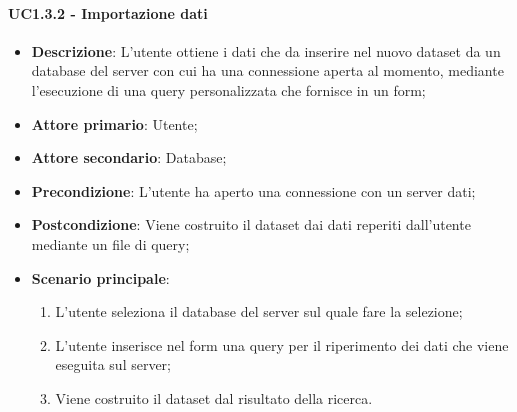 \paragraph{UC1.3.2 - Importazione dati}
\label{par:uc1.3.2}
\begin{itemize}
    \item \textbf{Descrizione}: L'utente ottiene i dati che da inserire nel nuovo dataset da un database
                                del server con cui ha una connessione aperta al momento, mediante 
                                l'esecuzione di una query personalizzata che fornisce in un form;

    \item \textbf{Attore primario}: Utente;
    
    \item \textbf{Attore secondario}: Database;
    
    \item \textbf{Precondizione}:   L'utente ha aperto una connessione con un server dati;
    \item \textbf{Postcondizione}:  Viene costruito il dataset dai dati reperiti dall'utente mediante un file di query;

	\item \textbf{Scenario principale}:
        \begin{enumerate}
            \item L'utente seleziona il database del server sul quale fare la selezione;
			\item L'utente inserisce nel form una query per il riperimento dei dati che viene eseguita sul server;
			\item Viene costruito il dataset dal risultato della ricerca.
        \end{enumerate}
\end{itemize}

